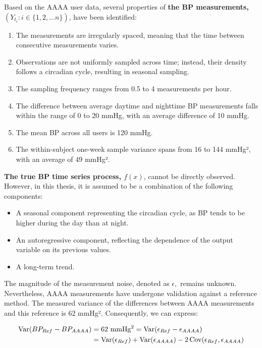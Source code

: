 Based on the AAAA user data, several properties of \textbf{the BP
measurements, $(Y_{t_i}: i \in \{1, 2, \dots n\})$}, have been identified:

\begin{enumerate}
\item The measurements are irregularly spaced, meaning that the time between
consecutive measurements varies.
\item Observations are not uniformly sampled across time; instead, their
density follows a circadian cycle, resulting in seasonal sampling.
\item The sampling frequency ranges from 0.5 to 4 measurements per hour.
\item The difference between average daytime and nighttime BP measurements
falls within the range of 0 to 20 mmHg, with an average difference of 10 mmHg.
\item The mean BP across all users is 120 mmHg.
\item The within-subject one-week sample variance spans from 16 to 144
mmHg², with an average of 49 mmHg².
\end{enumerate}


\textbf{The true BP time series process, $f(x)$}, cannot be directly observed.
However, in this thesis, it
is assumed to be a combination of the following components:

\begin{itemize}
\item A seasonal component representing the circadian cycle, as BP tends to be
higher during the day than at night.
\item An autoregressive component, reflecting the dependence of the output
variable on its previous values.
\item A long-term trend.
\end{itemize}

The magnitude of the measurement noise, denoted as $\epsilon,$ remains unknown.
Nevertheless, AAAA measurements have undergone validation against a reference
method. The measured variance of the differences between AAAA measurements and
this reference is 62 mmHg². Consequently, we can express:

\begin{align*}
    \operatorname{Var}(BP_{Ref} - BP_{AAAA})
    & = \text{62 mmHg\textsuperscript{2}} = \operatorname{Var}(\epsilon_{Ref} - \epsilon_{AAAA}) \\
    & = \operatorname{Var}(\epsilon_{Ref}) + \operatorname{Var}(\epsilon_{AAAA}) - 2\operatorname{Cov}(\epsilon_{Ref},
    \epsilon_{AAAA})
\end{align*}

